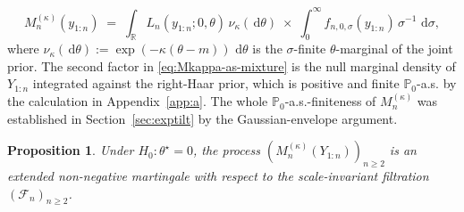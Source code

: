 \documentclass{article}%
\newtheorem{proposition}[theorem]{Proposition}
\newcommand{\dd}{\,\mathrm{d}}
\newcommand{\1}{\mathbf{1}}
\begin{document}
\begin{equation}\label{eq:Mkappa-as-mixture}
M_n^{(\kappa)}(y_{1:n})
\;=\;\int_\mathbb{R} L_n(y_{1:n};0,\theta)\,\nu_\kappa(\dd\theta)
\;\times\; \int_0^\infty f_{n,0,\sigma}(y_{1:n})\,\sigma^{-1}\,\dd\sigma,
\end{equation}
where \(\nu_\kappa(\dd\theta) := \exp(-\kappa(\theta-m))\,\dd\theta\) is
the \(\sigma\)-finite \(\theta\)-marginal of the joint prior. The
second factor in \eqref{eq:Mkappa-as-mixture} is the null marginal
density of \(Y_{1:n}\) integrated against the right-Haar prior, which is
positive and finite \(\mathbb{P}_0\)-a.s. by the calculation in Appendix~\ref{app:a}. The whole \(\mathbb{P}_0\)-a.s.-finiteness of \(M_n^{(\kappa)}\) was established in Section~\ref{sec:exptilt} by the Gaussian-envelope argument.

\begin{proposition}\label{prop:extended-mg}
Under \(H_0:\theta^\star=0\), the process
\((M_n^{(\kappa)}(Y_{1:n}))_{n\geq 2}\) is an extended non-negative
martingale with respect to the scale-invariant filtration
\((\mathcal{F}_n)_{n\geq 2}\).
\end{proposition}
\end{document}
